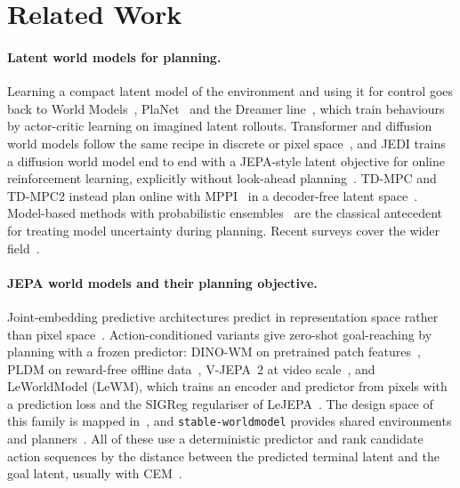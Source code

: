 \section{Related Work}
\label{sec:related}

\paragraph{Latent world models for planning.}
Learning a compact latent model of the environment and using it for control goes back to World Models~\cite{ha2018world}, PlaNet~\cite{hafner2019planet} and the Dreamer line~\cite{hafner2020dreamer,hafner2021dreamerv2,hafner2025dreamerv3,hafner2025dreamer4}, which train behaviours by actor-critic learning on imagined latent rollouts. Transformer and diffusion world models follow the same recipe in discrete or pixel space~\cite{micheli2023iris,alonso2024diamond}, and JEDI trains a diffusion world model end to end with a JEPA-style latent objective for online reinforcement learning, explicitly without look-ahead planning~\cite{lim2026jedi}. TD-MPC and TD-MPC2 instead plan online with MPPI~\cite{williams2016mppi} in a decoder-free latent space~\cite{hansen2022tdmpc,hansen2024tdmpc2}. Model-based methods with probabilistic ensembles~\cite{chua2018pets,janner2019mbpo,yu2020mopo} are the classical antecedent for treating model uncertainty during planning. Recent surveys cover the wider field~\cite{zidan2026survey,hou2026robotsurvey}.

\paragraph{JEPA world models and their planning objective.}
Joint-embedding predictive architectures predict in representation space rather than pixel space~\cite{assran2023ijepa,bardes2024vjepa}. Action-conditioned variants give zero-shot goal-reaching by planning with a frozen predictor: DINO-WM on pretrained patch features~\cite{zhou2024dinowm}, PLDM on reward-free offline data~\cite{sobal2025pldm}, V-JEPA~2 at video scale~\cite{assran2025vjepa2}, and LeWorldModel (LeWM), which trains an encoder and predictor from pixels with a prediction loss and the SIGReg regulariser of LeJEPA~\cite{maes2026lewm,balestriero2025lejepa}. The design space of this family is mapped in~\cite{terver2025jepawms}, and \texttt{stable-worldmodel} provides shared environments and planners~\cite{maes2026swm}. All of these use a deterministic predictor and rank candidate action sequences by the distance between the predicted terminal latent and the goal latent, usually with CEM~\cite{rubinstein1999cem}.


